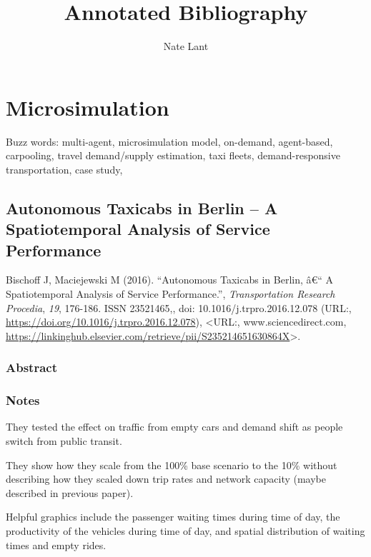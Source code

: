 \documentclass[]{article}
\title{Annotated Bibliography}
\author{Nate Lant}
\date{}
\begin{document}
\maketitle

\hypertarget{microsimulation}{%
\section{Microsimulation}\label{microsimulation}}

Buzz words: multi-agent, microsimulation model, on-demand, agent-based,
carpooling, travel demand/supply estimation, taxi fleets,
demand-responsive transportation, case study,

\hypertarget{autonomous-taxicabs-in-berlin-a-spatiotemporal-analysis-of-service-performance}{%
\subsection{Autonomous Taxicabs in Berlin -- A Spatiotemporal Analysis
of Service
Performance}\label{autonomous-taxicabs-in-berlin-a-spatiotemporal-analysis-of-service-performance}}

Bischoff J, Maciejewski M (2016). ``Autonomous Taxicabs in Berlin, â€``
A Spatiotemporal Analysis of Service Performance.'',
\emph{Transportation Research Procedia}, \emph{19}, 176-186. ISSN
23521465,, doi: 10.1016/j.trpro.2016.12.078 (URL:,
\url{https://doi.org/10.1016/j.trpro.2016.12.078}), \textless URL:,
www.sciencedirect.com,
\url{https://linkinghub.elsevier.com/retrieve/pii/S235214651630864X}\textgreater.

\hypertarget{abstract}{%
\subsubsection{Abstract}\label{abstract}}

\hypertarget{notes}{%
\subsubsection{Notes}\label{notes}}

They tested the effect on traffic from empty cars and demand shift as
people switch from public transit.

They show how they scale from the 100\% base scenario to the 10\%
without describing how they scaled down trip rates and network capacity
(maybe described in previous paper).

Helpful graphics include the passenger waiting times during time of day,
the productivity of the vehicles during time of day, and spatial
distribution of waiting times and empty rides.
\end{document}
